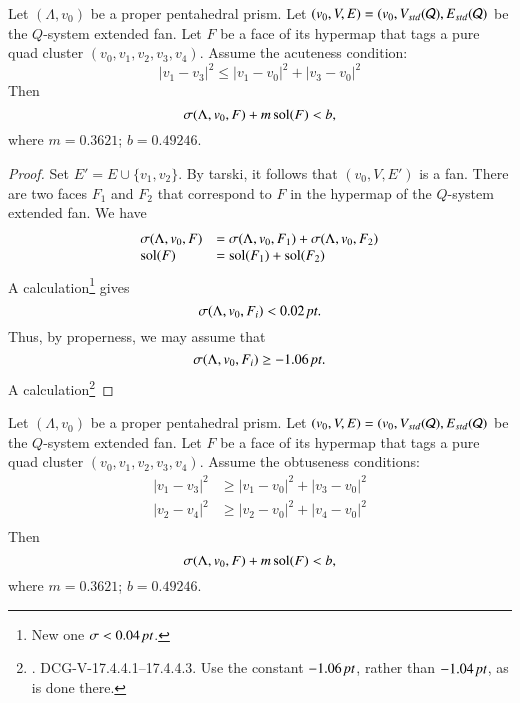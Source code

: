 \begin{lemma}
Let $(\Lambda,v_0)$ be a proper pentahedral prism.
Let $(v_0,V,E) = (v_0,V_{std}({\mathcal Q}),E_{std}({\mathcal Q})$ be the $Q$-system
extended fan.
Let $F$ be a face
of its hypermap that tags a pure quad cluster $(v_0,v_1,v_2,v_3,v_4)$.
Assume the acuteness condition:
  $$
  |v_1-v_3|^2 \le |v_1-v_0|^2 + |v_3-v_0|^2
  $$
Then
  $$
  \sigma(\Lambda,v_0,F) + m \operatorname{sol}(F) < b, 
  $$
where $m = 0.3621$; $b = 0.49246$.
\end{lemma}

\begin{proof}
Set $E' = E\cup \{v_1,v_2\}$.  By tarski, it follows
that $(v_0,V,E')$ is a fan.  There are two faces  $F_1$ and $F_2$
that correspond to $F$ in the  hypermap of the $Q$-system extended fan.
We have
 $$
  \begin{array}{lll}
  \sigma(\Lambda,v_0,F) &= \sigma(\Lambda,v_0,F_1) + \sigma(\Lambda,v_0,F_2)\\
   \operatorname{sol}(F) &=\operatorname{sol}(F_1) + \operatorname{sol}(F_2)\\
 \end{array}
 $$
A calculation\footnote{ New one $\sigma < 0.04\,\hbox{\it pt}$.}
gives 
  $$
  \sigma(\Lambda,v_0,F_i) < 0.02\,\hbox{\it pt}.
  $$
Thus, by properness, we may assume that
  $$
  \sigma(\Lambda,v_0,F_i) \ge -1.06\,\hbox{\it pt}.
  $$
A calculation\footnote{. DCG-V-17.4.4.1--17.4.4.3.  
Use the constant $-1.06\,\hbox{\it pt}$, rather than $-1.04\,\hbox{\it pt}$, as is done there.}
\end{proof}


\begin{lemma}
Let $(\Lambda,v_0)$ be a proper pentahedral prism.
Let $(v_0,V,E) = (v_0,V_{std}({\mathcal Q}),E_{std}({\mathcal Q})$ be the $Q$-system
extended fan.
Let $F$ be a face
of its hypermap that tags a pure quad cluster $(v_0,v_1,v_2,v_3,v_4)$.
Assume the obtuseness conditions:
  $$
  \begin{array}{lll}
  |v_1-v_3|^2 &\ge |v_1-v_0|^2 + |v_3-v_0|^2\\
  |v_2-v_4|^2 &\ge |v_2-v_0|^2 + |v_4-v_0|^2\\
  \end{array}
  $$
Then
  $$
  \sigma(\Lambda,v_0,F) + m \operatorname{sol}(F) < b, 
  $$
where $m = 0.3621$; $b = 0.49246$.
\end{lemma}


